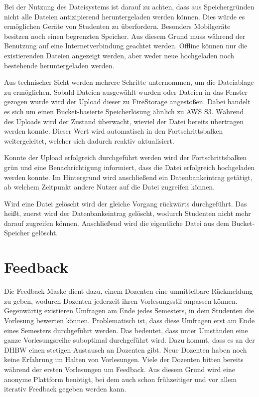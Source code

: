 Bei der Nutzung des Dateisystems ist darauf zu achten, dass aus Speichergründen nicht alle Dateien antizipierend heruntergeladen werden können.
Dies würde es ermöglichen Geräte von Studenten zu überfordern.
Besonders Mobilgeräte besitzen noch einen begrenzten Speicher.
Aus diesem Grund muss während der Benutzung auf eine Internetverbindung geachtet werden.
Offline können nur die existierenden Dateien angezeigt werden, aber weder neue hochgeladen noch bestehende heruntergeladen werden.


Aus technischer Sicht werden mehrere Schritte unternommen, um die Dateiablage zu ermöglichen.
Sobald Dateien ausgewählt wurden oder Dateien in das Fenster gezogen wurde wird der Upload dieser zu FireStorage angestoßen.
Dabei handelt es sich um einen Bucket-basierte Speicherlösung ähnlich zu AWS S3.
Während des Uploads wird der Zustand überwacht, wieviel der Datei bereits übertragen werden konnte.
Dieser Wert wird automatisch in den Fortschrittsbalken weitergeleitet, welcher sich dadurch reaktiv aktualisiert.


Konnte der Upload erfolgreich durchgeführt werden wird der Fortschrittsbalken grün und eine Benachrichtigung informiert, dass die Datei erfolgreich hochgeladen werden konnte.
Im Hintergrund wird anschließend ein Datenbankeintrag getätigt, ab welchem Zeitpunkt andere Nutzer auf die Datei zugreifen können.

Wird eine Datei gelöscht wird der gleiche Vorgang rückwärts durchgeführt.
Das heißt, zuerst wird der Datenbankeintrag gelöscht, wodurch Studenten nicht mehr darauf zugreifen können.
Anschließend wird die eigentliche Datei aus dem Bucket-Speicher gelöscht.


\section{Feedback}\label{sec:Feedback}
Die Feedback-Maske dient dazu, einem Dozenten eine unmittelbare Rückmeldung zu geben, wodurch Dozenten jederzeit ihren Vorlesungsstil anpassen können.
Gegenwärtig existieren Umfragen am Ende jedes Semesters, in dem Studenten die Vorlesung bewerten können.
Problematisch ist, dass diese Umfragen erst am Ende eines Semesters durchgeführt werden.
Das bedeutet, dass unter Umständen eine ganze Vorlesungsreihe suboptimal durchgeführt wird.
Dazu kommt, dass es an der DHBW einen stetigen Austausch an Dozenten gibt.
Neue Dozenten haben noch keine Erfahrung im Halten von Vorlesungen.
Viele der Dozenten bitten bereits während der ersten Vorlesungen um Feedback.
Aus diesem Grund wird eine anonyme Plattform benötigt, bei dem auch schon frühzeitiger und vor allem iterativ Feedback gegeben werden kann.

